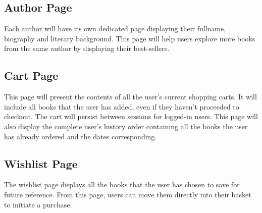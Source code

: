 \subsection{Author Page} \label{sec:author}
Each author will have its own dedicated page displaying their fullname, biography and literary background. This page will help users explore more books from the same author by displaying their best-sellers.

\subsection{Cart Page} \label{sec:cart}
This page will present the contents of all the user's current shopping carts. It will include all books that the user has added, even if they haven't proceeded to checkout. The cart will persist between sessions for logged-in users. This page will also display the complete user's history order containing all the books the user has already ordered and the dates corresponding. 

\subsection{Wishlist Page} \label{sec:wishlist}
The wishlist page displays all the books that the user has chosen to save for future reference. From this page, users can  move them directly into their basket to initiate a purchase.